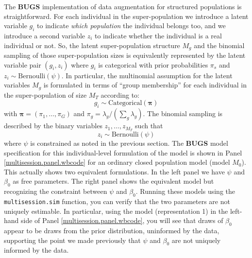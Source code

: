 The {\bf BUGS} implementation of data augmentation for structured
populations is straightforward.
For each 
individual in the
super-population we introduce a latent variable $g_{i}$ to indicate
{\it which population} the individual belongs too, and we introduce a second
variable $z_{i}$ to indicate whether the individual is a real
individual or not.  So, the latent super-population structure $M_{g}$
and the binomial sampling of those super-population sizes is
equivalently represented by the latent variable pair $(g_{i},z_{i})$
where $g_{i}$ is categorical with prior probabilities $\pi_{s}$ and
$z_{i} \sim \mbox{Bernoulli}(\psi)$.  In particular,
the multinomial assumption
for the latent variables $M_{g}$ is formulated in terms of ``group
membership'' for each individual in the super-population of size $M_{T}$
according to:
\[
 g_{i} \sim \mbox{Categorical}\left( {\bm \pi} \right)
\]
with ${\bm \pi} = (\pi_{1}, \ldots, \pi_{G})$ and $\pi_{g} =
\lambda_{g}/(\sum_{g} \lambda_{g})$.  The binomial sampling is
described by the binary variables $z_{1},\ldots,z_{M_{T}}$ such that
\[
 z_{i} \sim \mbox{Bernoulli}(\psi)
\]
where $\psi$ is constrained as noted in the previous section.  The
{\bf BUGS} model specification for this individual-level formulation
of the model is shown in Panel \ref{multisession.panel.wbcode} for an ordinary
closed population model (model $M_{0}$).  This actually shows two
equivalent formulations. In the left panel we have $\psi$ and
$\beta_{0}$ as free parameters.  The right panel shows the equivalent
model but recognizing the constraint between $\psi$ and $\beta_{0}$.
Running these models using the \mbox{\tt multisession.sim} 
function, you can verify that the two parameters are not uniquely estimable. In
particular,
 using the model
(representation 1) in the left-hand side of Panel \ref{multisession.panel.wbcode},
you will see that
draws of $\beta_{0}$
 appear to be draws from the prior distribution,
uninformed by the data, supporting the point we made previously that
$\psi$ and $\beta_0$ are not uniquely informed by the data.

